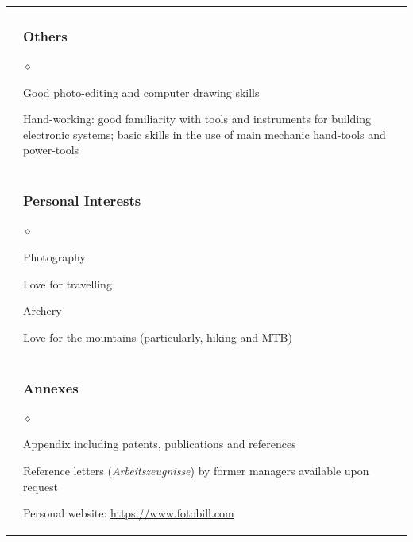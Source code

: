 \documentclass[a4paper]{article}
\def\sito{https://www.fotobill.com}
\newlength{\sectsep}
\newlength{\subsectsep}
\renewenvironment{itemize}{
  \begin{list}{$\diamond$}{
    \setlength{\topsep}{0.1em}
    \setlength{\itemsep}{0em}
    \setlength{\parskip}{0pt}
    \setlength{\parsep}{0em}
  }
}{
  \end{list}
}
\begin{document}
\begin{longtable}{r || l}
  & \begin{minipage}{0.9\textwidth}
      \vspace{\subsectsep}
      \subsubsection*{Others}
      \begin{itemize}
          \item Good photo-editing and computer drawing skills
          \item Hand-working: good familiarity with tools and instruments for building electronic systems; basic skills in the use of main mechanic hand-tools and power-tools
      \end{itemize}
  \end{minipage} \\[\sectsep]

  & \begin{minipage}{0.9\textwidth}
      \vspace{\subsectsep}
      \subsubsection*{Personal Interests}
      \begin{itemize}
          \item Photography
          \item Love for travelling
          \item Archery
          \item Love for the mountains (particularly, hiking and MTB)
      \end{itemize}
  \end{minipage} \\[\sectsep]

  & \begin{minipage}{0.9\textwidth}
      \vspace{\subsectsep}
      \subsubsection*{Annexes}
      \begin{itemize}
          \item Appendix including patents, publications and references
          \item Reference letters (\emph{Arbeitszeugnisse}) by former managers available upon request
          \item Personal website: \href{\sito}{\sito}
      \end{itemize}
      \vfill
    \end{minipage} \\

  \end{longtable}
\end{document}
